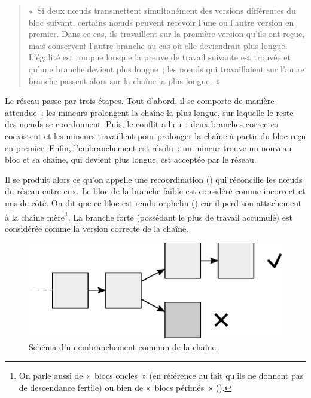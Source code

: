\begin{quote}
«~Si deux nœuds transmettent simultanément des versions différentes du bloc suivant, certains nœuds peuvent recevoir l'une ou l'autre version en premier. Dans ce cas, ils travaillent sur la première version qu'ils ont reçue, mais conservent l'autre branche au cas où elle deviendrait plus longue. L'égalité est rompue lorsque la preuve de travail suivante est trouvée et qu'une branche devient plus longue~; les nœuds qui travaillaient sur l'autre branche passent alors sur la chaîne la plus longue.~»
\end{quote}

Le réseau passe par trois étapes. Tout d'abord, il se comporte de manière attendue~: les mineurs prolongent la chaîne la plus longue, sur laquelle le reste des nœuds se coordonnent. Puis, le conflit a lieu~: deux branches correctes coexistent et les mineurs travaillent pour prolonger la chaîne à partir du bloc reçu en premier. Enfin, l'embranchement est résolu~: un mineur trouve un nouveau bloc et sa chaîne, qui devient plus longue, est acceptée par le réseau.

Il se produit alors ce qu'on appelle une recoordination () qui réconcilie les nœuds du réseau entre eux. Le bloc de la branche faible est considéré comme incorrect et mis de côté. On dit que ce bloc est rendu orphelin () car il perd son attachement à la chaîne mère\footnote{On parle aussi de «~blocs oncles~» (en référence au fait qu'ils ne donnent pas de descendance fertile) ou bien de «~blocs périmés~» ().}. La branche forte (possédant le plus de travail accumulé) est considérée comme la version correcte de la chaîne.

\begin{figure}[h]
  \centering
  \includegraphics[scale=0.8]{img/blockchain-common-fork.eps}
  \caption{Schéma d'un embranchement commun de la chaîne.}
  \label{fig:blockchain-common-fork}
\end{figure}

